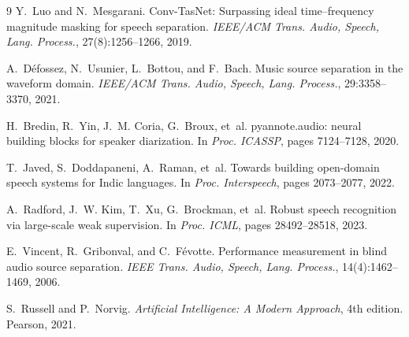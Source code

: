 \documentclass[11pt,a4paper,twocolumn]{article}
\begin{document}
\begin{thebibliography}{9}
\small
{}
Y.~Luo and N.~Mesgarani.
\newblock Conv-TasNet: Surpassing ideal time--frequency magnitude masking for speech separation.
\newblock \emph{IEEE/ACM Trans. Audio, Speech, Lang. Process.}, 27(8):1256--1266, 2019.

A.~D{\'e}fossez, N.~Usunier, L.~Bottou, and F.~Bach.
\newblock Music source separation in the waveform domain.
\newblock \emph{IEEE/ACM Trans. Audio, Speech, Lang. Process.}, 29:3358--3370, 2021.

H.~Bredin, R.~Yin, J.~M. Coria, G.~Broux, et~al.
\newblock pyannote.audio: neural building blocks for speaker diarization.
\newblock In \emph{Proc. ICASSP}, pages 7124--7128, 2020.

T.~Javed, S.~Doddapaneni, A.~Raman, et~al.
\newblock Towards building open-domain speech systems for Indic languages.
\newblock In \emph{Proc. Interspeech}, pages 2073--2077, 2022.

A.~Radford, J.~W. Kim, T.~Xu, G.~Brockman, et~al.
\newblock Robust speech recognition via large-scale weak supervision.
\newblock In \emph{Proc. ICML}, pages 28492--28518, 2023.

E.~Vincent, R.~Gribonval, and C.~F{\'e}votte.
\newblock Performance measurement in blind audio source separation.
\newblock \emph{IEEE Trans. Audio, Speech, Lang. Process.}, 14(4):1462--1469, 2006.

S.~Russell and P.~Norvig.
\newblock \emph{Artificial Intelligence: A Modern Approach}, 4th edition.
\newblock Pearson, 2021.
\end{thebibliography}
\end{document}
